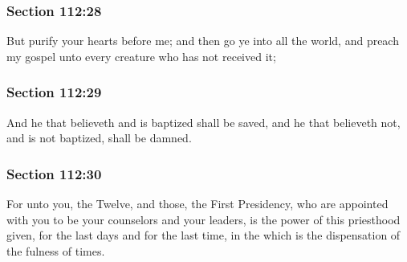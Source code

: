 	\subsubsection{Section 112:28} %
		\label{DC112-28}

		But purify your hearts before me; and then go ye into all the world, and preach my gospel unto every creature who has not received it;


	\subsubsection{Section 112:29} %
		\label{DC112-29}

		And he that believeth and is baptized shall be saved, and he that believeth not, and is not baptized, shall be damned.


	\subsubsection{Section 112:30} %
		\label{DC112-30}

		For unto you, the Twelve, and those, the First Presidency, who are appointed with you to be your counselors and your leaders, is the power of this priesthood given, for the last days and for the last time, in the which is the dispensation of the fulness of times.


